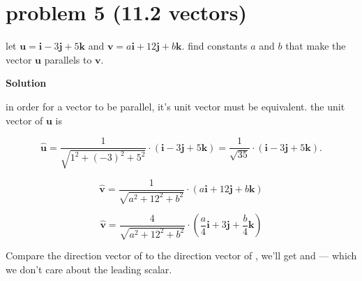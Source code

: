 \documentclass{article}
\newcommand{\solution}{\textbf{\large Solution}}
\theoremstyle{remark}
\begin{document}
\vspace{1em}
\hrulefill

\section*{problem 5 (11.2 vectors)}
let $\mathbf{u} = \mathbf{i} - 3\mathbf{j} + 5\mathbf{k}$ and $\mathbf{v} = a\mathbf{i} + 12\mathbf{j} + b\mathbf{k}$. find constants $a$ and $b$ that make the vector $\mathbf{u}$ parallels to $\mathbf{v}$.

\medskip
\solution

in order for a vector to be parallel, it's unit vector must be equivalent. the unit vector of $\mathbf{u}$ is

\[
  \widehat{\mathbf{u}}
  = \frac{1}{\sqrt{1^2+(-3)^2+5^2}} \cdot (\mathbf{i}-3\mathbf{j}+5\mathbf{k})
  = \frac{1}{\sqrt{35}} \cdot (\mathbf{i}-3\mathbf{j}+5\mathbf{k}).
\]

  \[
  \widehat{\mathbf{v}}
  = \frac{1}{\sqrt{a^{2}+12^{2}+b^{2}}} \cdot (a\mathbf{i}+12\mathbf{j}+b\mathbf{k})
  \]

\[
  \widehat{\mathbf{v}}
  = \frac{4}{\sqrt{a^{2}+12^{2}+b^{2}}} \cdot (\frac{a}{4}\mathbf{i}+3\mathbf{j}+\frac{b}{4}\mathbf{k})
\]

\vspace{1em}

Compare the direction vector of  to the direction vector of , we'll get  and  --- which we don't care about the leading scalar. 

\vspace{1em}
\hrulefill
\end{document}
